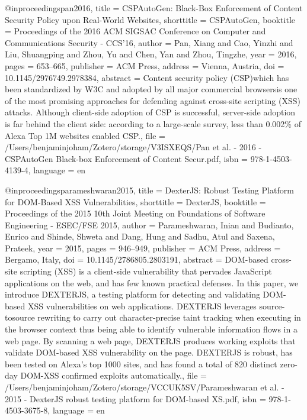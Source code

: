 @inproceedings{pan2016,
  title = {{{CSPAutoGen}}: {{Black}}-Box {{Enforcement}} of {{Content Security Policy}} upon {{Real}}-World {{Websites}}},
  shorttitle = {{{CSPAutoGen}}},
  booktitle = {Proceedings of the 2016 {{ACM SIGSAC Conference}} on {{Computer}} and {{Communications Security}} - {{CCS}}'16},
  author = {Pan, Xiang and Cao, Yinzhi and Liu, Shuangping and Zhou, Yu and Chen, Yan and Zhou, Tingzhe},
  year = {2016},
  pages = {653--665},
  publisher = {{ACM Press}},
  address = {{Vienna, Austria}},
  doi = {10.1145/2976749.2978384},
  abstract = {Content security policy (CSP)\textemdash{}which has been standardized by W3C and adopted by all major commercial browsers\textemdash{}is one of the most promising approaches for defending against cross-site scripting (XSS) attacks. Although client-side adoption of CSP is successful, server-side adoption is far behind the client side: according to a large-scale survey, less than 0.002\% of Alexa Top 1M websites enabled CSP.},
  file = {/Users/benjaminjoham/Zotero/storage/V3ISXEQS/Pan et al. - 2016 - CSPAutoGen Black-box Enforcement of Content Secur.pdf},
  isbn = {978-1-4503-4139-4},
  language = {en}
}

@inproceedings{parameshwaran2015,
  title = {{{DexterJS}}: Robust Testing Platform for {{DOM}}-Based {{XSS}} Vulnerabilities},
  shorttitle = {{{DexterJS}}},
  booktitle = {Proceedings of the 2015 10th {{Joint Meeting}} on {{Foundations}} of {{Software Engineering}} - {{ESEC}}/{{FSE}} 2015},
  author = {Parameshwaran, Inian and Budianto, Enrico and Shinde, Shweta and Dang, Hung and Sadhu, Atul and Saxena, Prateek},
  year = {2015},
  pages = {946--949},
  publisher = {{ACM Press}},
  address = {{Bergamo, Italy}},
  doi = {10.1145/2786805.2803191},
  abstract = {DOM-based cross-site scripting (XSS) is a client-side vulnerability that pervades JavaScript applications on the web, and has few known practical defenses. In this paper, we introduce DEXTERJS, a testing platform for detecting and validating DOM-based XSS vulnerabilities on web applications. DEXTERJS leverages source-tosource rewriting to carry out character-precise taint tracking when executing in the browser context \textemdash{} thus being able to identify vulnerable information flows in a web page. By scanning a web page, DEXTERJS produces working exploits that validate DOM-based XSS vulnerability on the page. DEXTERJS is robust, has been tested on Alexa's top 1000 sites, and has found a total of 820 distinct zero-day DOM-XSS confirmed exploits automatically.},
  file = {/Users/benjaminjoham/Zotero/storage/VCCUK5SV/Parameshwaran et al. - 2015 - DexterJS robust testing platform for DOM-based XS.pdf},
  isbn = {978-1-4503-3675-8},
  language = {en}
}

